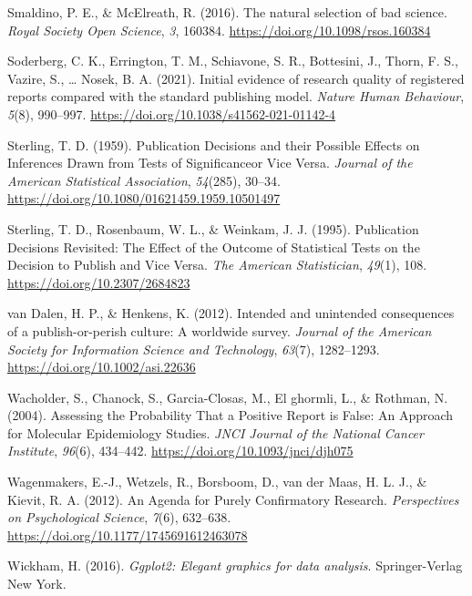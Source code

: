 \documentclass[british,,doc,mask,floatsintext]{apa6}
\begin{document}
\leavevmode\hypertarget{ref-Smaldino2016}{}%
Smaldino, P. E., \& McElreath, R. (2016). The natural selection of bad science. \emph{Royal Society Open Science}, \emph{3}, 160384. \url{https://doi.org/10.1098/rsos.160384}

\leavevmode\hypertarget{ref-Soderberg2021}{}%
Soderberg, C. K., Errington, T. M., Schiavone, S. R., Bottesini, J., Thorn, F. S., Vazire, S., \ldots{} Nosek, B. A. (2021). Initial evidence of research quality of registered reports compared with the standard publishing model. \emph{Nature Human Behaviour}, \emph{5}(8), 990--997. \url{https://doi.org/10.1038/s41562-021-01142-4}

\leavevmode\hypertarget{ref-Sterling1959}{}%
Sterling, T. D. (1959). Publication Decisions and their Possible Effects on Inferences Drawn from Tests of Significanceor Vice Versa. \emph{Journal of the American Statistical Association}, \emph{54}(285), 30--34. \url{https://doi.org/10.1080/01621459.1959.10501497}

\leavevmode\hypertarget{ref-Sterling1995}{}%
Sterling, T. D., Rosenbaum, W. L., \& Weinkam, J. J. (1995). Publication Decisions Revisited: The Effect of the Outcome of Statistical Tests on the Decision to Publish and Vice Versa. \emph{The American Statistician}, \emph{49}(1), 108. \url{https://doi.org/10.2307/2684823}

\leavevmode\hypertarget{ref-vanDalen2012}{}%
van Dalen, H. P., \& Henkens, K. (2012). Intended and unintended consequences of a publish-or-perish culture: A worldwide survey. \emph{Journal of the American Society for Information Science and Technology}, \emph{63}(7), 1282--1293. \url{https://doi.org/10.1002/asi.22636}

\leavevmode\hypertarget{ref-Wacholder2004}{}%
Wacholder, S., Chanock, S., Garcia-Closas, M., El ghormli, L., \& Rothman, N. (2004). Assessing the Probability That a Positive Report is False: An Approach for Molecular Epidemiology Studies. \emph{JNCI Journal of the National Cancer Institute}, \emph{96}(6), 434--442. \url{https://doi.org/10.1093/jnci/djh075}

\leavevmode\hypertarget{ref-Wagenmakers2012}{}%
Wagenmakers, E.-J., Wetzels, R., Borsboom, D., van der Maas, H. L. J., \& Kievit, R. A. (2012). An Agenda for Purely Confirmatory Research. \emph{Perspectives on Psychological Science}, \emph{7}(6), 632--638. \url{https://doi.org/10.1177/1745691612463078}

\leavevmode\hypertarget{ref-R-ggplot2}{}%
Wickham, H. (2016). \emph{Ggplot2: Elegant graphics for data analysis}. Springer-Verlag New York.
\end{document}
